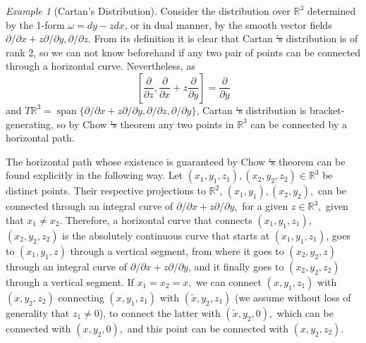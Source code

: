 \documentclass[12pt, letterpaper, reqno]{amsart}
\theoremstyle{definition}
\theoremstyle{plain}
\theoremstyle{remark}
\newtheorem{ex}{Example}
\providecommand{\DIFadd}[1]{{\protect\color{blue}\uwave{#1}}} %
\providecommand{\DIFdel}[1]{{\protect\color{red}\sout{#1}}}                      %
\providecommand{\DIFaddbegin}{} %
\providecommand{\DIFaddend}{} %
\providecommand{\DIFdelbegin}{} %
\providecommand{\DIFdelend}{} %
\newcommand{\DIFscaledelfig}{0.5}
\newlength{\DIFdelgraphicswidth} %
\newlength{\DIFdelgraphicsheight} %
\newcommand{\DIFaddincludegraphics}[2][]{{\color{blue}\fbox{\DIFOincludegraphics[#1]{#2}}}} %
\newcommand{\DIFdelincludegraphics}[2][]{%
\sbox{\DIFdelgraphicsbox}{\DIFOincludegraphics[#1]{#2}}%
\settoboxwidth{\DIFdelgraphicswidth}{\DIFdelgraphicsbox} %
\settoboxtotalheight{\DIFdelgraphicsheight}{\DIFdelgraphicsbox} %
\scalebox{\DIFscaledelfig}{%
\parbox[b]{\DIFdelgraphicswidth}{\usebox{\DIFdelgraphicsbox}\\[-\baselineskip] \rule{\DIFdelgraphicswidth}{0em}}\llap{\resizebox{\DIFdelgraphicswidth}{\DIFdelgraphicsheight}{%
\setlength{\unitlength}{\DIFdelgraphicswidth}%
\begin{picture}(1,1)%
\thicklines\linethickness{2pt} %
{\color[rgb]{1,0,0}\put(0,0){\framebox(1,1){}}}%
{\color[rgb]{1,0,0}\put(0,0){\line( 1,1){1}}}%
{\color[rgb]{1,0,0}\put(0,1){\line(1,-1){1}}}%
\end{picture}%
}\hspace*{3pt}}} %
} %
\DeclareRobustCommand{\DIFaddbegin}{\DIFOaddbegin \let\includegraphics\DIFaddincludegraphics} %
\DeclareRobustCommand{\DIFaddend}{\DIFOaddend \let\includegraphics\DIFOincludegraphics} %
\DeclareRobustCommand{\DIFdelbegin}{\DIFOdelbegin \let\includegraphics\DIFdelincludegraphics} %
\DeclareRobustCommand{\DIFdelend}{\DIFOaddend \let\includegraphics\DIFOincludegraphics} %
\begin{document}
\begin{ex}[Cartan's Distribution]\label{ex:cartan_distribution}
	Consider the distribution over $ \mathbb{R}^3 $ determined by the 1-form $\omega =dy- zdx $, or in dual manner, by the smooth vector fields $ \partial /\partial x + z \partial / \partial y, \partial/\partial z. $ From its definition it is clear that \DIFaddbegin \DIFadd{the }\DIFaddend Cartan \DIFdelbegin \DIFdel{'s }\DIFdelend distribution is of rank 2, so we can not know beforehand if any two pair of points can be connected through a horizontal curve. Nevertheless, as 
	$$ \left[ \frac{\partial}{\partial z}, \frac{\partial}{\partial x}+z \frac{\partial}{\partial y}    \right] = \frac{\partial}{\partial y}  $$ 
	and $ T \mathbb{R}^3 = \operatorname{span}\{  \partial/\partial x + z \partial / \partial y, \partial/\partial z, \partial/\partial y\} $, Cartan \DIFdelbegin \DIFdel{'s }\DIFdelend distribution is bracket-generating, so by Chow \DIFdelbegin \DIFdel{'s }\DIFdelend theorem any two points in $ \mathbb{R}^3 $ can be connected by a horizontal path.

	The horizontal path whose existence is guaranteed by Chow \DIFdelbegin \DIFdel{'s }\DIFdelend theorem can be found explicitly in the following way. Let $ (x_1,y_1,z_1), (x_2,y_2,z_2)\in \mathbb{R}^3 $ be distinct points. Their respective projections to $ \mathbb{R}^2 $, $(x_1, y_1), (x_2,y_2),$ can be connected through an integral curve of $ \partial/\partial x+ z\partial/\partial y, $ for a given $ z\in \mathbb{R}^3, $ given that $ x_1\neq x_2. $  Therefore, a horizontal curve that connects $  (x_1,y_1,z_1)$, $(x_2,y_2,z_2)$ is the absolutely continuous curve that starts at $ (x_1,y_1,z_1) $, goes to $ (x_1,y_1,z) $ through a vertical segment, from where it goes to $(x_2,y_2,z)  $ through an integral curve of $ \partial/\partial x+ z \partial/\partial y $, and it finally goes to $ (x_2,y_2,z_2) $ through a vertical segment. If $ x_1=x_2=x, $ we can connect $ (x,y_1,z_1) $ with $ (x,y_2,z_2) $ connecting $(x, y_1,z_1)$ with $ (\tilde x, y_2, z_1) $ (we assume without loss of generality that $ z_1\neq 0 $), to connect the latter with $ (\tilde x, y_2, 0), $ which can be connected with $ (x, y_2, 0), $ and this point can be connected with $ (x, y_2,z_2). $     
\end{ex}
\end{document}
